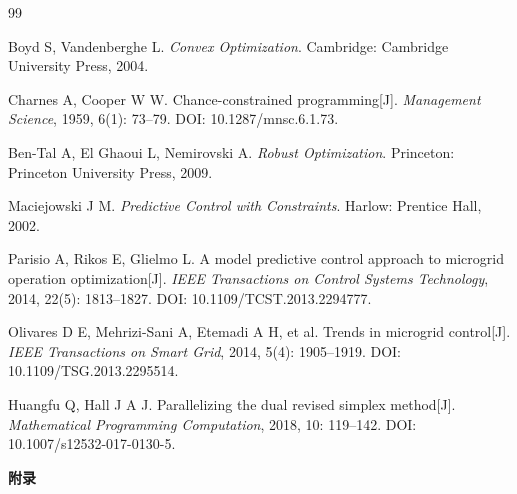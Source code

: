 \documentclass{cumcmthesis}
\begin{document}
\begin{thebibliography}{99}

Boyd S, Vandenberghe L. \textit{Convex Optimization}. Cambridge: Cambridge University Press, 2004.

Charnes A, Cooper W W. Chance-constrained programming[J]. \textit{Management Science}, 1959, 6(1): 73--79. DOI: 10.1287/mnsc.6.1.73.

Ben-Tal A, El Ghaoui L, Nemirovski A. \textit{Robust Optimization}. Princeton: Princeton University Press, 2009.

Maciejowski J M. \textit{Predictive Control with Constraints}. Harlow: Prentice Hall, 2002.

Parisio A, Rikos E, Glielmo L. A model predictive control approach to microgrid operation optimization[J]. \textit{IEEE Transactions on Control Systems Technology}, 2014, 22(5): 1813--1827. DOI: 10.1109/TCST.2013.2294777.

Olivares D E, Mehrizi-Sani A, Etemadi A H, et al. Trends in microgrid control[J]. \textit{IEEE Transactions on Smart Grid}, 2014, 5(4): 1905--1919. DOI: 10.1109/TSG.2013.2295514.

Huangfu Q, Hall J A J. Parallelizing the dual revised simplex method[J]. \textit{Mathematical Programming Computation}, 2018, 10: 119--142. DOI: 10.1007/s12532-017-0130-5.

\end{thebibliography}

\clearpage
\begin{center}
{\bfseries 附录\par}
\vspace{1.5em}
\end{center}
\end{document}
